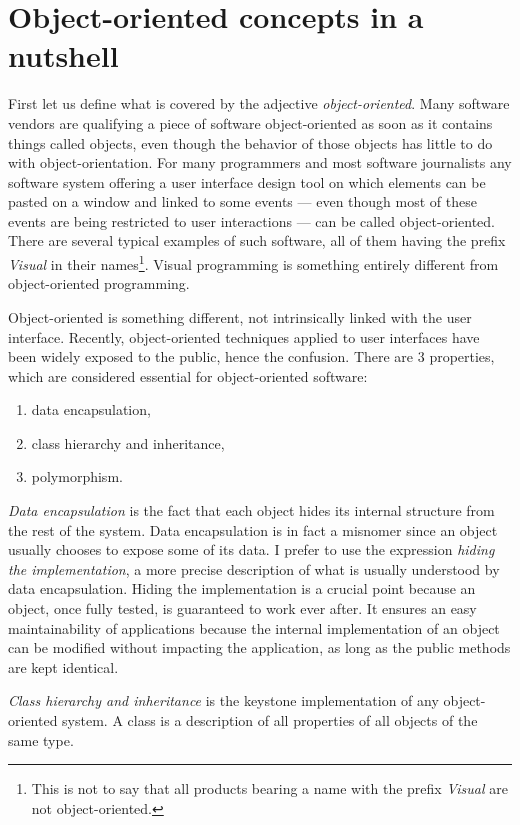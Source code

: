 \documentclass[twoside]{book}
\begin{document}
\section{Object-oriented concepts in a nutshell}
First let us define what is covered by the adjective {\it
object-oriented}. Many software vendors are qualifying a piece of
software object-oriented as soon as it contains things called
objects, even though the behavior of those objects has little to
do with object-orientation. For many programmers and most software
journalists any software system offering a user interface design
tool on which elements can be pasted on a window and linked to
some events --- even though most of these events are being
restricted to user interactions --- can be called object-oriented.
There are several typical examples of such software, all of them
having the prefix {\it Visual} in their names\footnote{This is not
to say that all products bearing a name with the prefix {\it
Visual} are not object-oriented.}. Visual programming is something
entirely different from object-oriented programming.
\par
Object-oriented is something different, not intrinsically linked
with the user interface. Recently, object-oriented techniques
applied to user interfaces have been widely exposed to the public,
hence the confusion. There are 3 properties, which are considered
essential for object-oriented software:
\begin{enumerate}
\item data encapsulation,
\item class hierarchy and inheritance,
\item polymorphism.
\end{enumerate}
{\it Data encapsulation} is the fact that each object hides its
internal structure from the rest of the system. Data encapsulation
is in fact a misnomer since an object usually chooses to expose
some of its data. I prefer to use the expression {\it hiding the
implementation}, a more precise description of what is usually
understood by data encapsulation. Hiding the implementation is a
crucial point because an object, once fully tested, is guaranteed
to work ever after. It ensures an easy maintainability of
applications because the internal implementation of an object can
be modified without impacting the application, as long as the
public methods are kept identical.
\par
{\it Class hierarchy and inheritance} is the keystone
implementation of any object-oriented system. A class is a
description of all properties of all objects of the same type.
\end{document}
